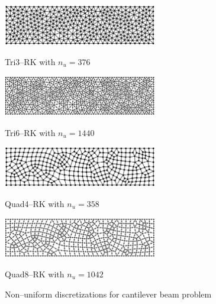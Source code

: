 \begin{figure}[H]
\centering
\begin{subcaptiongroup}
\parbox[b]{0.6\textwidth}{
    \includegraphics[width=0.6\textwidth]{png/cantilever_tri3_irregular_385.png}
    \caption{Tri3--RK with $n_u=376$}
}
\parbox[b]{0.6\textwidth}{
    \includegraphics[width=0.6\textwidth]{png/cantilever_tri6_irregular_1457.png}
    \caption{Tri6--RK with $n_u=1440$}
}
\parbox[b]{0.6\textwidth}{
    \includegraphics[width=0.6\textwidth]{png/cantilever_quad4_irregular_367.png}
    \caption{Quad4--RK with $n_u=358$}
}
\parbox[b]{0.6\textwidth}{
    \includegraphics[width=0.6\textwidth]{png/cantilever_quad8_irregular_1059.png}
    \caption{Quad8--RK with $n_u=1042$}
}
\end{subcaptiongroup}
\caption{Non--uniform discretizations for cantilever beam problem}\label{fg:cantilever_irregular_mesh}
\end{figure}

